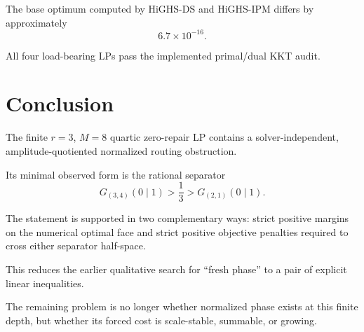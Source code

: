 \documentclass[11pt,a4paper]{article}
\begin{document}
The base optimum computed by HiGHS-DS and HiGHS-IPM differs by approximately
\[
6.7\times10^{-16}.
\]

All four load-bearing LPs pass the implemented primal/dual KKT audit.

\section{Conclusion}

The finite \(r=3\), \(M=8\) quartic zero-repair LP contains a
solver-independent, amplitude-quotiented normalized routing obstruction.

Its minimal observed form is the rational separator
\[
\boxed{
G_{(3,4)}(0\mid1)
>
\frac13
>
G_{(2,1)}(0\mid1).
}
\]

The statement is supported in two complementary ways:
strict positive margins on the numerical optimal face and strict positive
objective penalties required to cross either separator half-space.

This reduces the earlier qualitative search for ``fresh phase'' to a pair of
explicit linear inequalities.

The remaining problem is no longer whether normalized phase exists at this
finite depth, but whether its forced cost is scale-stable, summable, or
growing.
\end{document}
